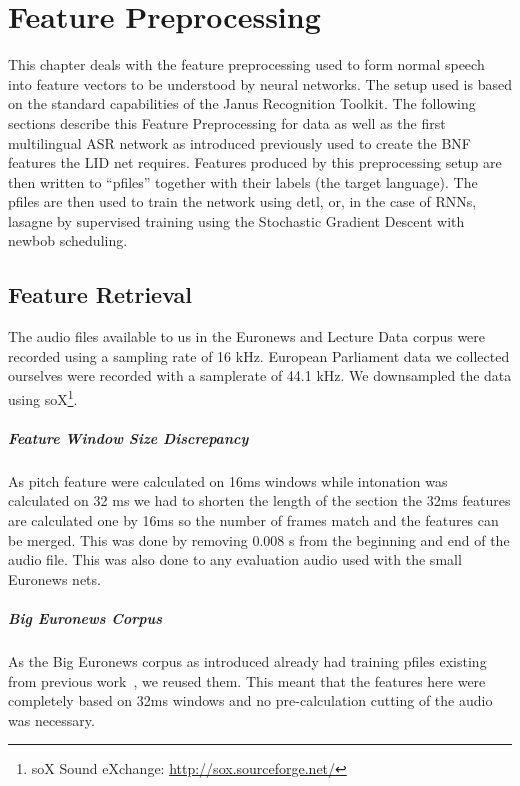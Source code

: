 \chapter{Feature Preprocessing}
\label{ch:FP}

This chapter deals with the feature preprocessing used to form normal speech into feature vectors to be understood by neural networks. The setup used is based on the standard capabilities of the Janus Recognition Toolkit. The following sections describe this Feature Preprocessing for data as well as the first multilingual ASR network as introduced previously used to create the BNF features the LID net requires. 
Features produced by this preprocessing setup are then written to ``pfiles'' together with their labels (the target language). The pfiles are then used to train the network using detl, or, in the case of RNNs, lasagne by supervised training using the Stochastic Gradient Descent with newbob scheduling.

\section{Feature Retrieval}
\label{sec:FP:FA}
The audio files available to us in the Euronews and Lecture Data corpus were recorded using a sampling rate of 16 kHz. European Parliament data we collected ourselves were recorded with a samplerate of 44.1 kHz. We downsampled the data using soX\footnote{soX Sound eXchange: \url{http://sox.sourceforge.net/}}. 
\paragraph{Feature Window Size Discrepancy} As pitch feature were calculated on 16ms windows while intonation was calculated on 32 ms we had to shorten the length of the section the 32ms features are calculated one by 16ms so the number of frames match and the features can be merged. This was done by removing  0.008 s from the beginning and end of the audio file. This was also done to any evaluation audio used with the small Euronews nets.
\paragraph{Big Euronews Corpus} As the Big Euronews corpus as introduced already had training pfiles existing from previous work~\cite{Mueller2016b}, we reused them. This meant that the features here were completely based on 32ms windows and no pre-calculation cutting of the audio was necessary.



